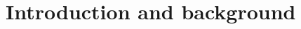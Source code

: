 \pagestyle{plain} %


\cleardoublepage %
\cleardoublepage %
\cleardoublepage %
\pagestyle{scrheadings} %
\cleardoublepage %

\cleardoublepage


\cleardoublepage %



\part{Introduction and background} %

